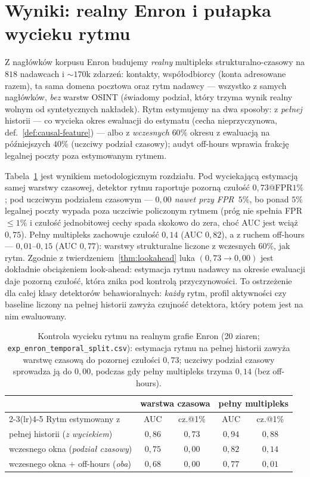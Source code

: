 \section{Wyniki: realny Enron i pułapka wycieku rytmu}
\label{sec:m-enron}

Z nagłówków korpusu Enron \citep{klimt2004enron} budujemy
\emph{realny} multipleks strukturalno-czasowy na $818$ nadawcach
i $\sim\!170$k zdarzeń: kontakty, współodbiorcy (konta adresowane
razem), ta sama domena pocztowa oraz rytm nadawcy --- wszystko
z samych nagłówków, \emph{bez} warstw OSINT (świadomy podział,
który trzyma wynik realny wolnym od syntetycznych nakładek).
Rytm estymujemy na dwa sposoby: z \emph{pełnej} historii --- co
wycieka okres ewaluacji do estymatu (cecha nieprzyczynowa,
def.~\ref{def:causal-feature}) --- albo z \emph{wczesnych} $60\%$
okresu z ewaluacją na późniejszych $40\%$ (uczciwy podział
czasowy); audyt off-hours wprawia frakcję legalnej poczty poza
estymowanym rytmem.

Tabela~\ref{tab:m-enronsplit} jest wynikiem metodologicznym
rozdziału. Pod wyciekającą estymacją samej warstwy czasowej,
detektor rytmu raportuje pozorną czułość $0{,}73$@FPR$1\%$;
pod uczciwym podziałem czasowym --- \emph{$0{,}00$ nawet przy
FPR~$5\%$}, bo ponad $5\%$ legalnej poczty wypada poza uczciwie
policzonym rytmem (próg nie spełnia FPR$\le1\%$ i czułość
jednobitowej cechy spada skokowo do zera, choć AUC jest wciąż
$0{,}75$). Pełny multipleks zachowuje czułość $0{,}14$
(AUC $0{,}82$), a z ruchem off-hours --- $0{,}01$--$0{,}15$
(AUC $0{,}77$): warstwy strukturalne liczone z wczesnych $60\%$,
jak rytm. Zgodnie z twierdzeniem~\ref{thm:lookahead} luka
$(0{,}73\to0{,}00)$ jest dokładnie obciążeniem look-ahead:
estymacja rytmu nadawcy na okresie ewaluacji daje pozorną
czułość, która znika pod kontrolą przyczynowości. To ostrzeżenie
dla całej klasy detektorów behawioralnych: \emph{każdy} rytm,
profil aktywności czy baseline liczony na pełnej historii zawyża
czujność detektora, który potem jest na nim ewaluowany.

\begin{table}[htbp]\centering
\begin{tabular}{lcccc}
\toprule
& \multicolumn{2}{c}{warstwa czasowa} & \multicolumn{2}{c}{pełny multipleks} \\
\cmidrule(lr){2-3}\cmidrule(lr){4-5}
Rytm estymowany z & AUC & cz.@1\% & AUC & cz.@1\% \\
\midrule
pełnej historii (\emph{z wyciekiem})   & $0{,}86$ & $0{,}73$ & $0{,}94$ & $0{,}88$ \\
wczesnego okna (\emph{podział czasowy}) & $0{,}75$ & $0{,}00$ & $0{,}82$ & $0{,}14$ \\
wczesnego okna $+$ off-hours (\emph{oba}) & $0{,}68$ & $0{,}00$ & $0{,}77$ & $0{,}01$ \\
\bottomrule
\end{tabular}
\caption{Kontrola wycieku rytmu na realnym grafie Enron (20 ziaren;
\texttt{exp\_enron\_temporal\_split.csv}): estymacja rytmu na pełnej
historii zawyża warstwę czasową do pozornej czułości $0{,}73$;
uczciwy podział czasowy sprowadza ją do $0{,}00$, podczas gdy pełny
multipleks trzyma $0{,}14$ (bez off-hours).}
\label{tab:m-enronsplit}
\end{table}

